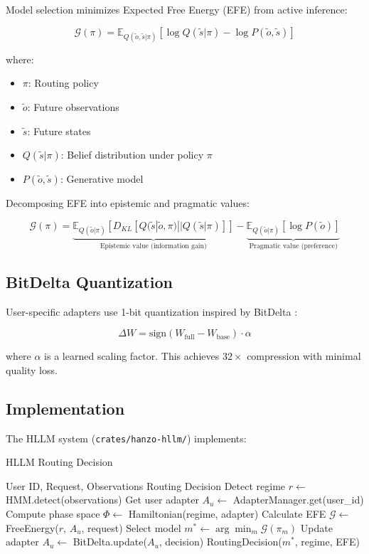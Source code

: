 \documentclass[11pt,twocolumn]{article}
\begin{document}
Model selection minimizes Expected Free Energy (EFE) from active inference:

\begin{equation}
\mathcal{G}(\pi) = \mathbb{E}_{Q(\tilde{o}, \tilde{s}|\pi)} \left[ \log Q(\tilde{s}|\pi) - \log P(\tilde{o}, \tilde{s}) \right]
\end{equation}

where:
\begin{itemize}
\item $\pi$: Routing policy
\item $\tilde{o}$: Future observations
\item $\tilde{s}$: Future states
\item $Q(\tilde{s}|\pi)$: Belief distribution under policy $\pi$
\item $P(\tilde{o}, \tilde{s})$: Generative model
\end{itemize}

Decomposing EFE into epistemic and pragmatic values:

\begin{equation}
\mathcal{G}(\pi) = \underbrace{\mathbb{E}_{Q(\tilde{o}|\pi)}[D_{KL}[Q(\tilde{s}|\tilde{o}, \pi)||Q(\tilde{s}|\pi)]]}_{\text{Epistemic value (information gain)}} - \underbrace{\mathbb{E}_{Q(\tilde{o}|\pi)}[\log P(\tilde{o})]}_{\text{Pragmatic value (preference)}}\end{equation}

\subsection{BitDelta Quantization}

User-specific adapters use 1-bit quantization inspired by BitDelta \cite{bitdelta}:

\begin{equation}
\Delta W = \text{sign}(W_{\text{full}} - W_{\text{base}}) \cdot \alpha
\end{equation}

where $\alpha$ is a learned scaling factor. This achieves $32\times$ compression with minimal quality loss.

\subsection{Implementation}

The HLLM system (\texttt{crates/hanzo-hllm/}) implements:

\begin{algorithm}
\caption{HLLM Routing Decision}
\begin{algorithmic}[1]
\REQUIRE User ID, Request, Observations
\ENSURE Routing Decision
\STATE Detect regime $r \leftarrow$ HMM.detect(observations)
\STATE Get user adapter $A_u \leftarrow$ AdapterManager.get(user\_id)
\STATE Compute phase space $\Phi \leftarrow$ Hamiltonian(regime, adapter)
\STATE Calculate EFE $\mathcal{G} \leftarrow$ FreeEnergy($r$, $A_u$, request)
\STATE Select model $m^* \leftarrow \arg\min_{m} \mathcal{G}(\pi_m)$
\STATE Update adapter $A_u \leftarrow$ BitDelta.update($A_u$, decision)
\RETURN RoutingDecision($m^*$, regime, EFE)
\end{algorithmic}
\end{algorithm}
\end{document}
